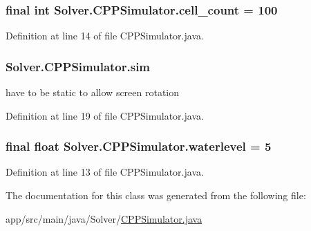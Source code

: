 \subsubsection[{\texorpdfstring{cell\+\_\+count}{cell_count}}]{\setlength{\rightskip}{0pt plus 5cm}final int Solver.\+C\+P\+P\+Simulator.\+cell\+\_\+count = 100\hspace{0.3cm}{\ttfamily [static]}}\hypertarget{classSolver_1_1CPPSimulator_a06273986348dfea50706c3e7d6f2e833}{}\label{classSolver_1_1CPPSimulator_a06273986348dfea50706c3e7d6f2e833}


Definition at line 14 of file C\+P\+P\+Simulator.\+java.

\subsubsection[{\texorpdfstring{sim}{sim}}]{ Solver.\+C\+P\+P\+Simulator.\+sim\hspace{0.3cm}{\ttfamily [static]}}\hypertarget{classSolver_1_1CPPSimulator_a2e835ffd2fbcba1842ae5e3eeab73225}{}\label{classSolver_1_1CPPSimulator_a2e835ffd2fbcba1842ae5e3eeab73225}


have to be static to allow screen rotation 



Definition at line 19 of file C\+P\+P\+Simulator.\+java.

\subsubsection[{\texorpdfstring{waterlevel}{waterlevel}}]{\setlength{\rightskip}{0pt plus 5cm}final float Solver.\+C\+P\+P\+Simulator.\+waterlevel = 5\hspace{0.3cm}{\ttfamily [static]}}\hypertarget{classSolver_1_1CPPSimulator_a727cbbce369b51d9d14f329661a75a49}{}\label{classSolver_1_1CPPSimulator_a727cbbce369b51d9d14f329661a75a49}


Definition at line 13 of file C\+P\+P\+Simulator.\+java.



The documentation for this class was generated from the following file\+:\begin{DoxyCompactItemize}
\item 
app/src/main/java/\+Solver/\hyperlink{CPPSimulator_8java}{C\+P\+P\+Simulator.\+java}\end{DoxyCompactItemize}
